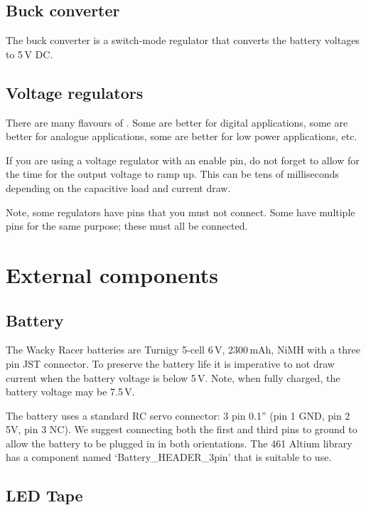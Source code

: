 \subsection{Buck converter}\label{buck-converter}

The buck converter is a switch-mode regulator that converts the
battery voltages to 5\,V DC.


\subsection{Voltage regulators}\label{voltage-regulators}

There are many flavours of .
Some are better for digital applications, some are better for analogue
applications, some are better for low power applications, etc.

If you are using a voltage regulator with an enable pin, do not forget
to allow for the time for the output voltage to ramp up. This can be
tens of milliseconds depending on the capacitive load and current draw.

Note, some regulators have pins that you must not connect. Some have
multiple pins for the same purpose; these must all be connected.


\section{External components}

\subsection{Battery}

The Wacky Racer batteries are Turnigy 5-cell 6\,V, 2300\,mAh, NiMH
with a three pin JST connector.  To preserve the battery life it is
imperative to not draw current when the battery voltage is below 5\,V.
Note, when fully charged, the battery voltage may be 7.5\,V.

The battery uses a standard RC servo connector: 3 pin 0.1'' (pin 1
GND, pin 2 5V, pin 3 NC). We suggest connecting both the first and
third pins to ground to allow the battery to be plugged in in both
orientations. The 461 Altium library has a component named
`Battery\_HEADER\_3pin' that is suitable to use.

\subsection{LED Tape}

